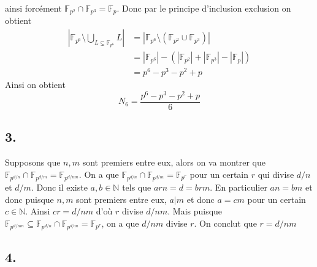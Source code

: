 \documentclass{article}
\newcommand{\F}{\mathbb{F}}
\begin{document}
\begin{itemize}
		ainsi forcément $\F_{p^2}\cap\F_{p^3} = \F_p$.
		Donc par le principe d'inclusion exclusion on obtient
		\begin{align*}
			|\F_{p^6}\setminus
			\bigcup_{L \subsetneq \F_{p^6}}L| &=
			|\F_{p^6} \setminus (\F_{p^2} \cup \F_{p^3})|\\
			&= |\F_{p^6}| - (|\F_{p^2}| + |\F_{p^3}| - |\F_{p}|)\\
			&= p^6 - p^3 - p^2 + p
		\end{align*}
		Ainsi on obtient
		\begin{equation*}
			N_6 = \frac{p^6 - p^3 - p^2 + p}{6}
		\end{equation*}
\end{itemize}

\subsection*{3.}

Supposons que $n,m$ sont premiers entre eux,
alors on va montrer que 
$\F_{p^{d/n}} \cap \F_{p^{d/m}} = \F_{p^{d/nm}}$.
On a que $\F_{p^{d/n}} \cap \F_{p^{d/m}} = \F_{p^r}$ pour un
certain $r$ qui divise $d/n$ et $d/m$. Donc il existe
$a, b \in \mathbb{N}$ tels que $arn = d = brm$. En particulier
$an = bm$ et donc puisque $n,m$ sont premiers entre eux,
$a | m$ et donc $a = cm$ pour un certain $c\in \mathbb{N}$.
Ainsi $cr = d/nm$ d'où $r$ divise $d/nm$.
Mais puisque $\F_{p^{d/nm}} \subseteq \F_{p^{d/n}}
\cap \F_{p^{d/m}} = \F_{p^r}$, on a que $d/nm$ divise $r$.
On conclut que $r = d/nm$

\subsection*{4.}
\end{document}
